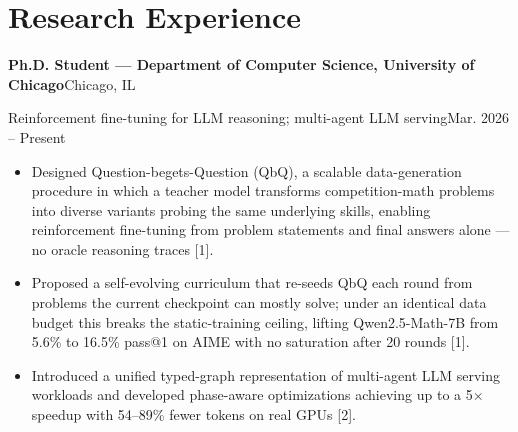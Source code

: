 \documentclass[11pt]{article}
\newcommand{\entry}[2]{\noindent\textbf{#1}\hfill #2\par}
\newcommand{\subentry}[2]{\noindent #1\hfill #2\par}
\begin{document}
\section{Research Experience}
\entry{Ph.D. Student --- Department of Computer Science, University of Chicago}{Chicago, IL}
\subentry{Reinforcement fine-tuning for LLM reasoning; multi-agent LLM serving}{Mar. 2026 -- Present}
\begin{itemize}[leftmargin=1.2em, itemsep=2pt, topsep=4pt]
    \item Designed Question-begets-Question (QbQ), a scalable data-generation procedure in which a teacher model transforms competition-math problems into diverse variants probing the same underlying skills, enabling reinforcement fine-tuning from problem statements and final answers alone --- no oracle reasoning traces [1].
    \item Proposed a self-evolving curriculum that re-seeds QbQ each round from problems the current checkpoint can mostly solve; under an identical data budget this breaks the static-training ceiling, lifting Qwen2.5-Math-7B from 5.6\% to 16.5\% pass@1 on AIME with no saturation after 20 rounds [1].
    \item Introduced a unified typed-graph representation of multi-agent LLM serving workloads and developed phase-aware optimizations achieving up to a 5$\times$ speedup with 54--89\% fewer tokens on real GPUs [2].
\end{itemize}
\end{document}
